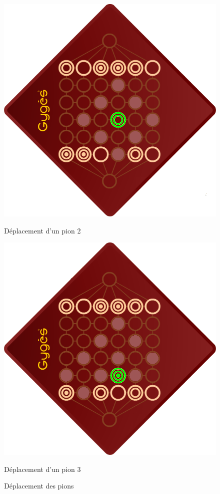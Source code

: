 \documentclass[a4paper]{article}
\begin{document}
\begin{itemize}
\begin{figure}[ht]
\begin{minipage}[b]{0.28\linewidth}
					\includegraphics[width=\textwidth]{move2.png}
					\caption{Déplacement d'un pion 2}
					\label{fig:figure2}
					\end{minipage}
					\hspace{0.5cm}
					\begin{minipage}[b]{0.28\linewidth}
					\centering
					\includegraphics[width=\textwidth]{move3.png}
					\caption{Déplacement d'un pion 3}
					\label{fig:figure3}
					\end{minipage}
					\caption{Déplacement des pions}
				\end{figure}


\end{itemize}
\end{document}
